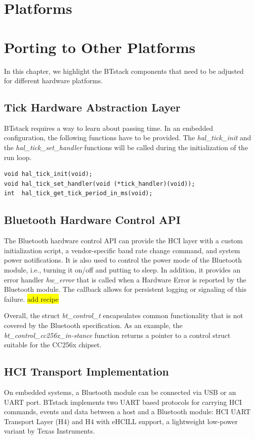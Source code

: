 \documentclass[a4paper,titlepage,oneside,12pt]{amsart} %
\newcommand{\todo}[1]{\colorbox{yellow}{#1}}
\begin{document}
\section{Platforms}


\section{Porting to Other Platforms}

In this chapter, we highlight the BTstack components that need to be adjusted for different hardware platforms.
\subsection{Tick Hardware Abstraction Layer}
\label{section:tickAbstraction}

BTstack requires a way to learn about passing time. In an embedded configuration, the following functions have to be provided. The \emph{hal\_tick\_init} and the \emph{hal\_tick\_set\_handler} functions will be called during the initialization of the run loop.
 
 \begin{lstlisting}
void hal_tick_init(void);
void hal_tick_set_handler(void (*tick_handler)(void));
int  hal_tick_get_tick_period_in_ms(void);
 \end{lstlisting}
 
\subsection{Bluetooth Hardware Control API}
\label{section:bt_hw_control}
The Bluetooth hardware control API can provide the HCI layer with a custom initialization script, a vendor-specific baud rate change command, and system power notifications. It is also used to control the power mode of the Bluetooth module, i.e., turning it on/off and putting to sleep. In addition, it provides an error handler \emph{hw\_error} that is called when a Hardware Error is reported by the Bluetooth module. The callback allows for persistent logging or signaling of this failure. \todo{add recipe}

Overall, the struct \emph{bt\_control\_t} encapsulates common functionality that is not covered by the Bluetooth specification. As an example, the \emph{bt\_control\_cc256x\_in-stance} function returns a pointer to a control struct suitable for the CC256x chipset.

 \subsection{HCI Transport Implementation}
 \label{section:hci_transport}
On embedded systems, a Bluetooth module can be connected via USB or an UART port. BTstack implements two UART based protocols for carrying HCI commands, events and data between a host and a Bluetooth module: HCI UART Transport Layer (H4) and H4 with eHCILL support, a lightweight low-power variant by Texas Instruments.
\end{document}
